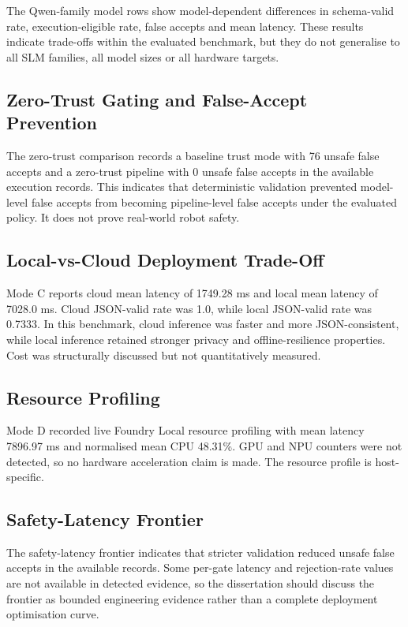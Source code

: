 \documentclass[sigconf,nonacm]{acmart}
\begin{document}
The Qwen-family model rows show model-dependent differences in schema-valid rate, execution-eligible rate, false accepts and mean latency. These results indicate trade-offs within the evaluated benchmark, but they do not generalise to all SLM families, all model sizes or all hardware targets.

\subsection{Zero-Trust Gating and False-Accept Prevention}

The zero-trust comparison records a baseline trust mode with 76 unsafe false accepts and a zero-trust pipeline with 0 unsafe false accepts in the available execution records. This indicates that deterministic validation prevented model-level false accepts from becoming pipeline-level false accepts under the evaluated policy. It does not prove real-world robot safety.

\subsection{Local-vs-Cloud Deployment Trade-Off}

Mode C reports cloud mean latency of 1749.28 ms and local mean latency of 7028.0 ms. Cloud JSON-valid rate was 1.0, while local JSON-valid rate was 0.7333. In this benchmark, cloud inference was faster and more JSON-consistent, while local inference retained stronger privacy and offline-resilience properties. Cost was structurally discussed but not quantitatively measured.

\subsection{Resource Profiling}

Mode D recorded live Foundry Local resource profiling with mean latency 7896.97 ms and normalised mean CPU 48.31\%. GPU and NPU counters were not detected, so no hardware acceleration claim is made. The resource profile is host-specific.

\subsection{Safety-Latency Frontier}

The safety-latency frontier indicates that stricter validation reduced unsafe false accepts in the available records. Some per-gate latency and rejection-rate values are not available in detected evidence, so the dissertation should discuss the frontier as bounded engineering evidence rather than a complete deployment optimisation curve.
\end{document}

